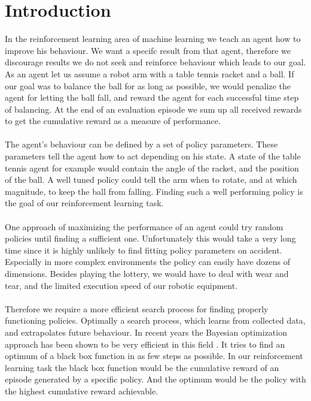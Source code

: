 \chapter{Introduction}
\label{chap:0}

In the reinforcement learning area of machine learning we teach an agent how to improve his behaviour. We want a specifc result from that agent, therefore we discourage results we do not seek and reinforce behaviour which leads to our goal. As an agent let us assume a robot arm with a table tennis racket and a ball. If our goal was to balance the ball for as long as possible, we would penalize the agent for letting the ball fall, and reward the agent for each successful time step of balancing. At the end of an evaluation episode we sum up all received rewards to get the cumulative reward as a measure of performance.\\
\\
The agent's behaviour can be defined by a set of policy parameters. These parameters tell the agent how to act depending on his state. A state of the table tennis agent for example would contain the angle of the racket, and the position of the ball. A well tuned policy could tell the arm when to rotate, and at which magnitude, to keep the ball from falling. Finding such a well performing policy is the goal of our reinforcement learning task.\\
\\
One approach of maximizing the performance of an agent could try random policies until finding a sufficient one. Unfortunately this would take a very long time since it is highly unlikely to find fitting policy parameters on accident. Especially in more complex environments the policy can easily have dozens of dimensions. Besides playing the lottery, we would have to deal with wear and tear, and the limited execution speed of our robotic equipment.\\
\\
Therefore we require a more efficient search process for finding properly functioning policies. Optimally a search process, which learns from collected data, and extrapolates future behaviour. In recent years the Bayesian optimization approach has been shown to be very efficient in this field \cite{brochu2010tutorial, shahriari2016taking, lizotte2008practical}. It tries to find an optimum of a black box function in as few steps as possible. In our reinforcement learning task the black box function would be the cumulative reward of an episode generated by a specific policy. And the optimum would be the policy with the highest cumulative reward achievable.\\
